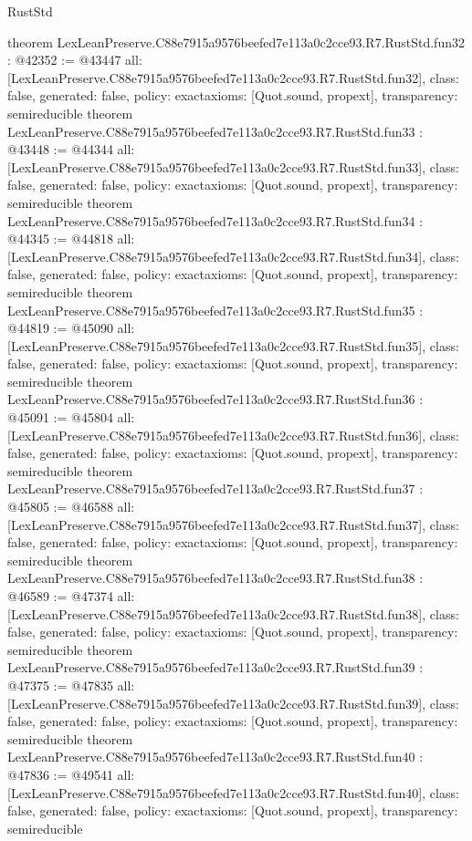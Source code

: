 \begin{lexlean}{RustStd}
\begin{coremodule}
{}
theorem LexLeanPreserve.C88e7915a9576beefed7e113a0c2cce93.R7.RustStd.fun32 : @42352 := @43447 {
  all: [LexLeanPreserve.C88e7915a9576beefed7e113a0c2cce93.R7.RustStd.fun32],
  class: false,
  generated: false,
  policy: exact{axioms: [Quot.sound, propext]},
  transparency: semireducible
}
theorem LexLeanPreserve.C88e7915a9576beefed7e113a0c2cce93.R7.RustStd.fun33 : @43448 := @44344 {
  all: [LexLeanPreserve.C88e7915a9576beefed7e113a0c2cce93.R7.RustStd.fun33],
  class: false,
  generated: false,
  policy: exact{axioms: [Quot.sound, propext]},
  transparency: semireducible
}
theorem LexLeanPreserve.C88e7915a9576beefed7e113a0c2cce93.R7.RustStd.fun34 : @44345 := @44818 {
  all: [LexLeanPreserve.C88e7915a9576beefed7e113a0c2cce93.R7.RustStd.fun34],
  class: false,
  generated: false,
  policy: exact{axioms: [Quot.sound, propext]},
  transparency: semireducible
}
theorem LexLeanPreserve.C88e7915a9576beefed7e113a0c2cce93.R7.RustStd.fun35 : @44819 := @45090 {
  all: [LexLeanPreserve.C88e7915a9576beefed7e113a0c2cce93.R7.RustStd.fun35],
  class: false,
  generated: false,
  policy: exact{axioms: [Quot.sound, propext]},
  transparency: semireducible
}
theorem LexLeanPreserve.C88e7915a9576beefed7e113a0c2cce93.R7.RustStd.fun36 : @45091 := @45804 {
  all: [LexLeanPreserve.C88e7915a9576beefed7e113a0c2cce93.R7.RustStd.fun36],
  class: false,
  generated: false,
  policy: exact{axioms: [Quot.sound, propext]},
  transparency: semireducible
}
theorem LexLeanPreserve.C88e7915a9576beefed7e113a0c2cce93.R7.RustStd.fun37 : @45805 := @46588 {
  all: [LexLeanPreserve.C88e7915a9576beefed7e113a0c2cce93.R7.RustStd.fun37],
  class: false,
  generated: false,
  policy: exact{axioms: [Quot.sound, propext]},
  transparency: semireducible
}
theorem LexLeanPreserve.C88e7915a9576beefed7e113a0c2cce93.R7.RustStd.fun38 : @46589 := @47374 {
  all: [LexLeanPreserve.C88e7915a9576beefed7e113a0c2cce93.R7.RustStd.fun38],
  class: false,
  generated: false,
  policy: exact{axioms: [Quot.sound, propext]},
  transparency: semireducible
}
theorem LexLeanPreserve.C88e7915a9576beefed7e113a0c2cce93.R7.RustStd.fun39 : @47375 := @47835 {
  all: [LexLeanPreserve.C88e7915a9576beefed7e113a0c2cce93.R7.RustStd.fun39],
  class: false,
  generated: false,
  policy: exact{axioms: [Quot.sound, propext]},
  transparency: semireducible
}
theorem LexLeanPreserve.C88e7915a9576beefed7e113a0c2cce93.R7.RustStd.fun40 : @47836 := @49541 {
  all: [LexLeanPreserve.C88e7915a9576beefed7e113a0c2cce93.R7.RustStd.fun40],
  class: false,
  generated: false,
  policy: exact{axioms: [Quot.sound, propext]},
  transparency: semireducible
}
\end{coremodule}
\end{lexlean}
